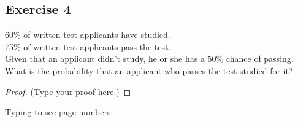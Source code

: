 \documentclass[12pt]{article}
\begin{document}
\subsection*{Exercise 4}
60\% of written test applicants have studied. \\ 
75\% of written test applicants pass the test. \\
Given that an applicant didn't study, he or she has a 50\% chance of passing. \\
What is the probability that an applicant who passes the test studied for it? 

\begin{proof}
(Type your proof here.)
\end{proof}

\vspace{2in} %

\vspace{3in}
Typing to see page numbers
\end{document}

